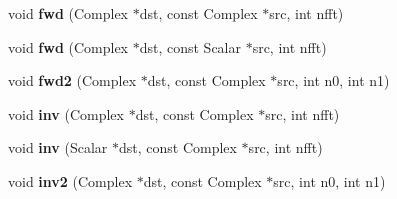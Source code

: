 \begin{DoxyCompactItemize}
\mbox{\label{struct_eigen_1_1internal_1_1fftw__impl_a05501269081c686ab80e5c8c5bcab72f}} 
void {\bfseries fwd} (Complex $\ast$dst, const Complex $\ast$src, int nfft)
\item 
\mbox{\label{struct_eigen_1_1internal_1_1fftw__impl_a85a7d7260407e1019d393ddcffb68e09}} 
void {\bfseries fwd} (Complex $\ast$dst, const Scalar $\ast$src, int nfft)
\item 
\mbox{\label{struct_eigen_1_1internal_1_1fftw__impl_a671245ef0355ec65de96dcdef10bf669}} 
void {\bfseries fwd2} (Complex $\ast$dst, const Complex $\ast$src, int n0, int n1)
\item 
\mbox{\label{struct_eigen_1_1internal_1_1fftw__impl_a76148ef976cee611506b6f30147eb427}} 
void {\bfseries inv} (Complex $\ast$dst, const Complex $\ast$src, int nfft)
\item 
\mbox{\label{struct_eigen_1_1internal_1_1fftw__impl_a3a89d08e9eb6783e780a3cf04850a811}} 
void {\bfseries inv} (Scalar $\ast$dst, const Complex $\ast$src, int nfft)
\item 
\mbox{\label{struct_eigen_1_1internal_1_1fftw__impl_a774406207808bedb1dcce992a446ffdd}} 
void {\bfseries inv2} (Complex $\ast$dst, const Complex $\ast$src, int n0, int n1)
\end{DoxyCompactItemize}
